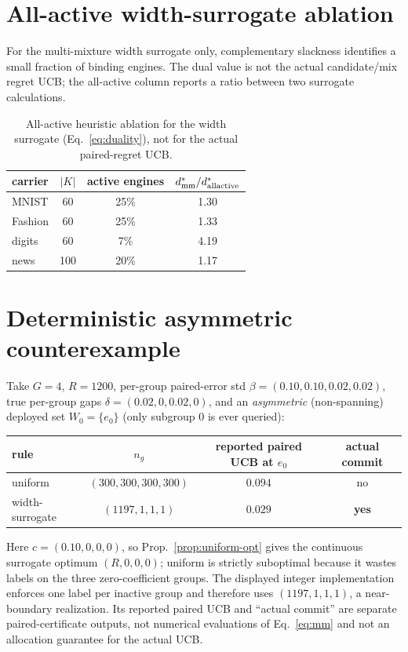 \documentclass{article}
\begin{document}
\section{All-active width-surrogate ablation}
\label{app:m35}
For the multi-mixture width surrogate only, complementary slackness identifies a small fraction
of binding engines. The dual value is not the actual candidate/mix regret UCB; the all-active
column reports a ratio between two surrogate calculations.
\begin{table}[h]
\centering\small\setlength{\tabcolsep}{4pt}
\begin{tabular}{lccc}
\toprule
carrier & $|K|$ & active engines & $d^*_{\rm mm}/d^*_{\rm allactive}$ \\
\midrule
MNIST & 60 & 25\% & 1.30 \\
Fashion & 60 & 25\% & 1.33 \\
digits & 60 & 7\% & 4.19 \\
news & 100 & 20\% & 1.17 \\
\bottomrule
\end{tabular}
\caption{All-active heuristic ablation for the width surrogate (Eq.~\ref{eq:duality}), not
for the actual paired-regret UCB.}
\label{tab:m35ab}
\end{table}

\section{Deterministic asymmetric counterexample}
\label{app:counter}
Take $G{=}4$, $R{=}1200$, per-group paired-error std $\beta=(0.10,0.10,0.02,0.02)$, true
per-group gaps $\delta=(0.02,0,0.02,0)$, and an \emph{asymmetric} (non-spanning) deployed set
$W_0=\{e_0\}$ (only subgroup $0$ is ever queried):
\begin{center}
\begin{tabular}{lccc}
\toprule
rule & $n_g$ & reported paired UCB at $e_0$ & actual commit \\
\midrule
uniform & $(300,300,300,300)$ & $0.094$ & no \\
width-surrogate & $(1197,1,1,1)$ & $0.029$ & \textbf{yes} \\
\bottomrule
\end{tabular}
\end{center}
Here $c=(0.10,0,0,0)$, so Prop.~\ref{prop:uniform-opt} gives the continuous surrogate optimum
$(R,0,0,0)$; uniform is strictly suboptimal because it wastes labels on the three
zero-coefficient groups. The displayed integer implementation enforces one label per inactive
group and therefore uses $(1197,1,1,1)$, a near-boundary realization. Its reported paired UCB
and ``actual commit'' are separate paired-certificate outputs, not numerical evaluations of
Eq.~\eqref{eq:mm} and not an allocation guarantee for the actual UCB.
\end{document}
